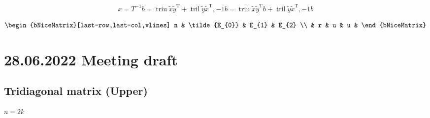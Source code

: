 \documentclass[11pt]{article}
\newcommand{\triu}{\mathop{\mathrm{triu}}}
\newcommand{\tril}{\mathop{\mathrm{tril}}}
\newcommand{\T}{\mathrm{T}}
\begin{document}
\begin{align*}
    x=T^{-1} b = \triu{\tilde{x} \tilde{y}^{\T}} + \tril{\tilde{y} \tilde{x}^{\T}, -1} b 
    =\triu{\tilde{x} \tilde{y}^{\T}} b + \tril{\tilde{y} \tilde{x}^{\T}, -1} b
\end{align*}



$$
\begin{bNiceMatrix}[last-row,last-col,vlines]
    n & \tilde{E_{0}} & E_{1} & E_{2} \\
    & r & u & u &
\end{bNiceMatrix}
$$


\newpage
\section{28.06.2022 Meeting draft}


\subsection{Tridiagonal matrix (Upper)}






$n = 2k$
\end{document}
